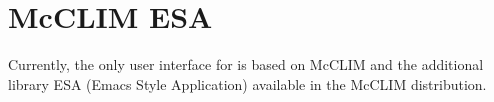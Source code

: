 \chapter{McCLIM ESA}

Currently, the only user interface for \sysname{} is based on McCLIM
and the additional library ESA (Emacs Style Application) available in
the McCLIM distribution.

